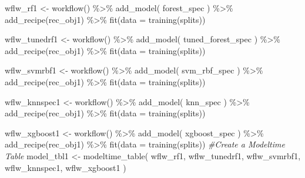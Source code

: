 \documentclass[
]{article}
\newenvironment{Shaded}{\begin{snugshade}}{\end{snugshade}}
\newcommand{\AttributeTok}[1]{\textcolor[rgb]{0.77,0.63,0.00}{#1}}
\newcommand{\CommentTok}[1]{\textcolor[rgb]{0.56,0.35,0.01}{\textit{#1}}}
\newcommand{\FunctionTok}[1]{\textcolor[rgb]{0.00,0.00,0.00}{#1}}
\newcommand{\NormalTok}[1]{#1}
\newcommand{\OtherTok}[1]{\textcolor[rgb]{0.56,0.35,0.01}{#1}}
\newcommand{\SpecialCharTok}[1]{\textcolor[rgb]{0.00,0.00,0.00}{#1}}
\begin{document}
\begin{Shaded}
\begin{Highlighting}[]
\NormalTok{wflw\_rf1 }\OtherTok{\textless{}{-}} \FunctionTok{workflow}\NormalTok{() }\SpecialCharTok{\%\textgreater{}\%}
    \FunctionTok{add\_model}\NormalTok{(}
\NormalTok{        forest\_spec}
\NormalTok{    ) }\SpecialCharTok{\%\textgreater{}\%}
    \FunctionTok{add\_recipe}\NormalTok{(rec\_obj1) }\SpecialCharTok{\%\textgreater{}\%}
    \FunctionTok{fit}\NormalTok{(}\AttributeTok{data =} \FunctionTok{training}\NormalTok{(splits))}

\NormalTok{wflw\_tunedrf1 }\OtherTok{\textless{}{-}} \FunctionTok{workflow}\NormalTok{() }\SpecialCharTok{\%\textgreater{}\%}
    \FunctionTok{add\_model}\NormalTok{(}
\NormalTok{        tuned\_forest\_spec}
\NormalTok{    ) }\SpecialCharTok{\%\textgreater{}\%}
    \FunctionTok{add\_recipe}\NormalTok{(rec\_obj1) }\SpecialCharTok{\%\textgreater{}\%}
    \FunctionTok{fit}\NormalTok{(}\AttributeTok{data =} \FunctionTok{training}\NormalTok{(splits))}

\NormalTok{wflw\_svmrbf1 }\OtherTok{\textless{}{-}} \FunctionTok{workflow}\NormalTok{() }\SpecialCharTok{\%\textgreater{}\%}
    \FunctionTok{add\_model}\NormalTok{(}
\NormalTok{        svm\_rbf\_spec}
\NormalTok{    ) }\SpecialCharTok{\%\textgreater{}\%}
    \FunctionTok{add\_recipe}\NormalTok{(rec\_obj1) }\SpecialCharTok{\%\textgreater{}\%}
    \FunctionTok{fit}\NormalTok{(}\AttributeTok{data =} \FunctionTok{training}\NormalTok{(splits))}

\NormalTok{wflw\_knnspec1 }\OtherTok{\textless{}{-}} \FunctionTok{workflow}\NormalTok{() }\SpecialCharTok{\%\textgreater{}\%}
    \FunctionTok{add\_model}\NormalTok{(}
\NormalTok{        knn\_spec}
\NormalTok{    ) }\SpecialCharTok{\%\textgreater{}\%}
    \FunctionTok{add\_recipe}\NormalTok{(rec\_obj1) }\SpecialCharTok{\%\textgreater{}\%}
    \FunctionTok{fit}\NormalTok{(}\AttributeTok{data =} \FunctionTok{training}\NormalTok{(splits))}

\NormalTok{wflw\_xgboost1 }\OtherTok{\textless{}{-}} \FunctionTok{workflow}\NormalTok{() }\SpecialCharTok{\%\textgreater{}\%}
    \FunctionTok{add\_model}\NormalTok{(}
\NormalTok{        xgboost\_spec}
\NormalTok{    ) }\SpecialCharTok{\%\textgreater{}\%}
    \FunctionTok{add\_recipe}\NormalTok{(rec\_obj1) }\SpecialCharTok{\%\textgreater{}\%}
    \FunctionTok{fit}\NormalTok{(}\AttributeTok{data =} \FunctionTok{training}\NormalTok{(splits))  }
\CommentTok{\#Create a Modeltime Table}
\NormalTok{model\_tbl1 }\OtherTok{\textless{}{-}} \FunctionTok{modeltime\_table}\NormalTok{(}
\NormalTok{    wflw\_rf1,}
\NormalTok{    wflw\_tunedrf1,}
\NormalTok{    wflw\_svmrbf1,}
\NormalTok{    wflw\_knnspec1,}
\NormalTok{    wflw\_xgboost1}
\NormalTok{)}
\end{Highlighting}
\end{Shaded}
\end{document}
